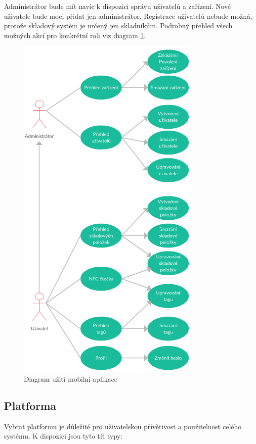 \documentclass[czech,BP]{thesiskiv}
\begin{document}
		Administrátor bude mít navíc k dispozici správu uživatelů a zařízení.
		Nové uživatele bude moci přidat jen administrátor. Registrace uživatelů nebude možná, protože skladový systém je určený jen skladníkům.
		Podrobný přehled všech možných akcí pro konkrétní roli viz diagram \ref{fig:mobile_app_use_case}. 
		
\begin{figure}[H]
		\centering
		\includegraphics[width=0.8\textwidth]{../diagrams/mobile_app_use_case.png}	
		\caption{Diagram užití mobilní aplikace}
		\label{fig:mobile_app_use_case}
	\end{figure}
		
		
		
		\subsection{Platforma}
			Vybrat platformu je důležité pro uživatelskou přívětivost a použitelnost celého systému. K dispozici jsou tyto tři typy: 		
			
\end{document}
